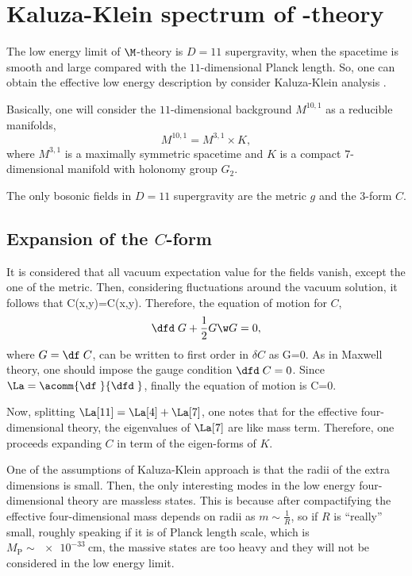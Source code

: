 \section{Kaluza-Klein spectrum of \M-theory}

The low energy limit of $\M$-theory is $D=11$ supergravity, when  the spacetime is smooth and large compared with the $11$-dimensional Planck length. So, one can obtain the effective low energy description by consider Kaluza-Klein analysis \cite{Papadopoulos:1995da,Acharya:2004qe}. 

Basically, one will consider the $11$-dimensional background $M^{10,1}$ as a reducible manifolds, $$M^{10,1}=M^{3,1}\times K,$$where $M^{3,1}$ is a maximally symmetric spacetime and $K$ is a compact $7$-dimensional manifold with holonomy group $G_2$.

The only bosonic fields in $D=11$ supergravity are the metric $g$ and the $3$-form $C$. 

\subsection{Expansion of the $C$-form}

It is  considered that all vacuum expectation value for  the fields vanish, except the one of the metric. Then, considering fluctuations around the vacuum solution, it follows that
\beq
C(x,y)=\delta C(x,y).
\eeq
Therefore, the equation of motion for $C$, 
\begin{align}
  \dfd\;G+\frac{1}{2}G\w G=0,\label{eq:C}
\end{align}
where $G=\df\;C$, can be written to first order in $\delta C$ as
\beq
\dfd \;G=0.
\eeq
As in Maxwell theory, one should impose the gauge condition $\dfd\;C=0$. Since $\La=\acomm{\df\;}{\dfd\;}$, finally the equation of motion is
\beq
\La[11] C=0.
\eeq

Now, splitting $\La[11]=\La[4]+\La[7]$, one notes that for the effective four-dimensional theory, the eigenvalues of $\La[7]$ are like  mass term. Therefore, one proceeds  expanding $C$ in term of the eigen-forms of $K$.

One of the  assumptions of Kaluza-Klein approach is that %
the radii of the extra dimensions is small. Then, the only interesting modes in the low energy four-dimensional theory are  massless states. This is because after compactifying the effective four-dimensional mass depends on radii as $m\sim \frac{1}{R}$, so if $R$ is ``really'' small, roughly speaking if it is of Planck length scale, which is $M_{\text{P}}\sim\SI{e-33}{\cm}$, the massive states are too heavy and they will not be considered in the low energy limit.

